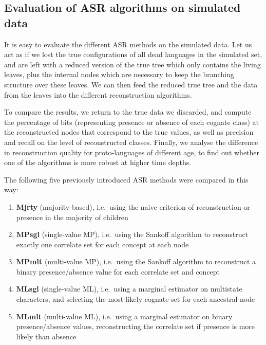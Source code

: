 \subsection{Evaluation of ASR algorithms on simulated data}
It is easy to evaluate the different ASR methods on the simulated data. Let us act as if we lost the true configurations of all dead languages in the simulated set, and are left with a reduced version of the true tree which only contains the living leaves, plus the internal nodes which are necessary to keep the branching structure over these leaves. We can then feed the reduced true tree and the data from the leaves into the different reconstruction algorithms.

To compare the results, we return to the true data we discarded, and compute the percentage of bits (representing presence or absence of each cognate class) at the reconstructed nodes that correspond to the true values, as well as precision and recall on the level of reconstructed classes. Finally, we analyse the difference in reconstruction quality for proto-languages of different age, to find out whether one of the algorithms is more robust at higher time depths.

The following five previously introduced ASR methods were compared in this way:
\begin{enumerate}
  \item \textbf{Mjrty} (majority-based), i.e.\ using the naive criterion of reconstruction or presence in the majority of children
  \item \textbf{MPsgl} (single-value MP), i.e.\ using the Sankoff algorithm to reconstruct exactly one correlate set for each concept at each node
  \item \textbf{MPmlt} (multi-value MP), i.e.\ using the Sankoff algorithm to reconstruct a binary presence/absence value for each correlate set and concept
  \item \textbf{MLsgl} (single-value ML), i.e.\ using a marginal estimator on multistate characters, and selecting the most likely cognate set for each ancestral node
  \item \textbf{MLmlt} (multi-value ML), i.e.\ using a marginal estimator on binary presence/absence values, reconstructing the correlate set if presence is more likely than absence
\end{enumerate}

